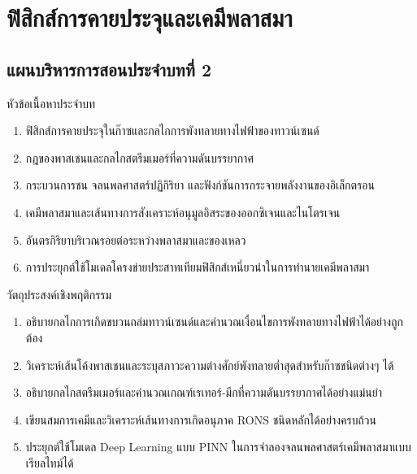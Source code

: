 \chapter{ฟิสิกส์การคายประจุและเคมีพลาสมา}
\label{chap:ch02}


\section*{แผนบริหารการสอนประจำบทที่ 2}

\begin{planbox}{หัวข้อเนื้อหาประจำบท}
\begin{enumerate}
    \item ฟิสิกส์การคายประจุในก๊าซและกลไกการพังทลายทางไฟฟ้าของทาวน์เซนด์
    \item กฎของพาสเชนและกลไกสตรีมเมอร์ที่ความดันบรรยากาศ
    \item กระบวนการชน จลนพลศาสตร์ปฏิกิริยา และฟังก์ชันการกระจายพลังงานของอิเล็กตรอน
    \item เคมีพลาสมาและเส้นทางการสังเคราะห์อนุมูลอิสระของออกซิเจนและไนโตรเจน
    \item อันตรกิริยาบริเวณรอยต่อระหว่างพลาสมาและของเหลว
    \item การประยุกต์ใช้โมเดลโครงข่ายประสาทเทียมฟิสิกส์เหนี่ยวนำในการทำนายเคมีพลาสมา
\end{enumerate}
\end{planbox}

\begin{planbox}{วัตถุประสงค์เชิงพฤติกรรม}
\begin{enumerate}
    \item อธิบายกลไกการเกิดขบวนถล่มทาวน์เซนด์และคำนวณเงื่อนไขการพังทลายทางไฟฟ้าได้อย่างถูกต้อง
    \item วิเคราะห์เส้นโค้งพาสเชนและระบุสภาวะความต่างศักย์พังทลายต่ำสุดสำหรับก๊าซชนิดต่างๆ ได้
    \item อธิบายกลไกสตรีมเมอร์และคำนวณเกณฑ์เรเทอร์-มีกที่ความดันบรรยากาศได้อย่างแม่นยำ
    \item เขียนสมการเคมีและวิเคราะห์เส้นทางการเกิดอนุภาค RONS ชนิดหลักได้อย่างครบถ้วน
    \item ประยุกต์ใช้โมเดล Deep Learning แบบ PINN ในการจำลองจลนพลศาสตร์เคมีพลาสมาแบบเรียลไทม์ได้
\end{enumerate}
\end{planbox}

